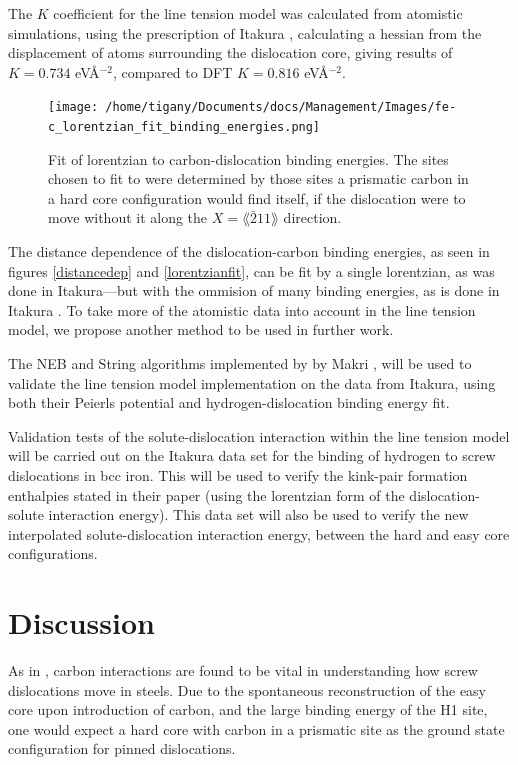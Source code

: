 \documentclass[a4paper,11pt]{article}
\begin{document}
The \(K\) coefficient for the line tension model  was calculated from atomistic simulations, using the prescription of Itakura \cite{Itakura2012},
calculating a hessian from the displacement of atoms surrounding the dislocation core, giving
results of \(K = 0.734\) eV\AA{}\(^{-2}\), compared to DFT \(K = 0.816\) eV\AA{}\(^{-2}\). 

\begin{figure}[htbp]
\centering
\texttt{[image: /home/tigany/Documents/docs/Management/Images/fe-c\_lorentzian\_fit\_binding\_energies.png]}
\caption{\label{fig:orgc33dbc7}
Fit of lorentzian to carbon-dislocation binding energies. The sites chosen to fit to were determined by those sites a prismatic carbon in a hard core configuration would find itself, if the dislocation were to move without it along the \(X = \lang\bar{2}11\rang\) direction.}
\end{figure}



The distance dependence of the dislocation-carbon binding energies,
as seen in figures \ref{distancedep} and \ref{lorentzianfit}, can be fit by a
single lorentzian, as was done in Itakura---but with the ommision
of many binding energies, as is done in Itakura
\cite{itakura13_effec_hydrog_atoms_screw_disloc}. To take more of the
atomistic data into account in the line tension model, we propose
another method to be used in further work.


The NEB and String algorithms implemented by by Makri \cite{Makri2019}, will be used to validate the line
tension model implementation on the data from Itakura, using both their Peierls potential
and hydrogen-dislocation binding energy fit.


Validation tests of the solute-dislocation interaction within the line tension model will be carried
out on the Itakura data set for the binding of hydrogen to screw dislocations in bcc iron. This
will be used to verify the kink-pair formation enthalpies stated in their paper (using the
lorentzian form of the dislocation-solute interaction energy). This data set will also be used to
verify the new interpolated solute-dislocation interaction energy, between
the hard and easy core configurations.



\section{Discussion}
\label{sec:org70c9d5b}


As in \cite{Lthi2019}, carbon interactions are found to be vital in understanding how screw
dislocations move in steels. Due to the spontaneous reconstruction of the easy core upon
introduction of carbon, and the large binding energy of the H1 site, one would expect a hard
core with carbon in a prismatic site as the ground state configuration for pinned
dislocations. 
\end{document}
